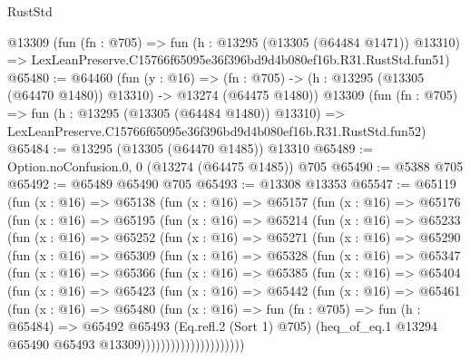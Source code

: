 \begin{lexlean}{RustStd}
\begin{coremodule}
    @13309
    (fun (fn : @705) =>
    fun (h : @13295 (@13305 (@64484 @1471)) @13310) =>
    LexLeanPreserve.C15766f65095e36f396bd9d4b080ef16b.R31.RustStd.fun51)
@65480 := @64460
    (fun (y : @16) =>
    (fn : @705) -> (h : @13295 (@13305 (@64470 @1480)) @13310) -> @13274 (@64475 @1480))
    @13309
    (fun (fn : @705) =>
    fun (h : @13295 (@13305 (@64484 @1480)) @13310) =>
    LexLeanPreserve.C15766f65095e36f396bd9d4b080ef16b.R31.RustStd.fun52)
@65484 := @13295 (@13305 (@64470 @1485)) @13310
@65489 := Option.noConfusion.{0, 0} (@13274 (@64475 @1485)) @705
@65490 := @5388 @705
@65492 := @65489 @65490 @705
@65493 := @13308 @13353
@65547 := @65119
    (fun (x : @16) =>
    @65138
      (fun (x : @16) =>
      @65157
        (fun (x : @16) =>
        @65176
          (fun (x : @16) =>
          @65195
            (fun (x : @16) =>
            @65214
              (fun (x : @16) =>
              @65233
                (fun (x : @16) =>
                @65252
                  (fun (x : @16) =>
                  @65271
                    (fun (x : @16) =>
                    @65290
                      (fun (x : @16) =>
                      @65309
                        (fun (x : @16) =>
                        @65328
                          (fun (x : @16) =>
                          @65347
                            (fun (x : @16) =>
                            @65366
                              (fun (x : @16) =>
                              @65385
                                (fun (x : @16) =>
                                @65404
                                  (fun (x : @16) =>
                                  @65423
                                    (fun (x : @16) =>
                                    @65442
                                      (fun (x : @16) =>
                                      @65461
                                        (fun (x : @16) =>
                                        @65480
                                          (fun (x : @16) =>
                                          fun (fn : @705) =>
                                          fun (h : @65484) =>
                                          @65492
                                            @65493
                                            (Eq.refl.{2} (Sort 1) @705)
                                            (heq_of_eq.{1}
                                              @13294
                                              @65490
                                              @65493
                                              @13309)))))))))))))))))))))

\end{coremodule}
\end{lexlean}

